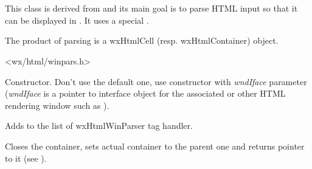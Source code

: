 %
%

\section{}\label{wxhtmlwinparser}

This class is derived from  and
its main goal is to parse HTML input so that it can be displayed in
. It uses a special 
.


The product of parsing is a wxHtmlCell (resp. wxHtmlContainer) object.




<wx/html/winpars.h>




\label{wxhtmlwinparserwxhtmlwinparser}



Constructor. Don't use the default one, use constructor with
{\it wndIface} parameter ({\it wndIface} is a pointer to interface object for
the associated  or other HTML rendering
window such as ).

\label{wxhtmlwinparseraddmodule}


Adds  to the list of wxHtmlWinParser tag handler.

\label{wxhtmlwinparserclosecontainer}


Closes the container, sets actual container to the parent one
and returns pointer to it (see ).

